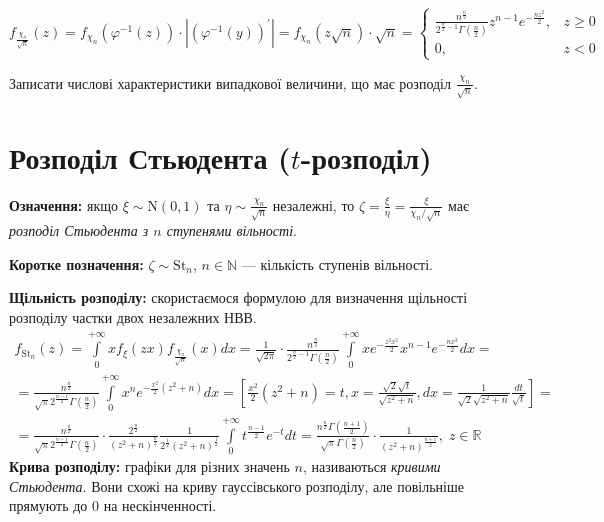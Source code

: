 \begin{equation*}
    f_{\frac{\chi_n}{\sqrt{n}}}(z) = f_{\chi_n}\left(\varphi^{-1} (z)\right) \cdot \left|\left(\varphi^{-1} (y) \right)^{\prime}\right| =
f_{\chi_n}(z \sqrt{n}) \cdot \sqrt{n} = 
\begin{cases}
    \frac{n^{\frac{n}{2}}}{2^{\frac{n}{2} - 1} \Gamma\left(\frac{n}{2}\right)} z^{n-1} e^{-\frac{nz^2}{2}}, & z \geq 0 \\
    0, & z < 0
\end{cases}
\end{equation*}
\begin{exercise}
    Записати числові характеристики випадкової величини, що має розподіл $\frac{\chi_n}{\sqrt{n}}$.
\end{exercise}

\section{Розподіл Стьюдента (\texorpdfstring{$t$}{t}-розподіл)}
\noindent\textbf{Означення:} якщо $\xi \sim \mathrm{N}(0, 1)$ та $\eta \sim \frac{\chi_n}{\sqrt{n}}$ незалежні,
то $\zeta = \frac{\xi}{\eta} = \frac{\xi}{\chi_n /\sqrt{n}}$ має \emph{розподіл Стьюдента з $n$ ступенями вільності}.

\noindent\textbf{Коротке позначення:} $\zeta \sim \mathrm{St}_n$, $n\in\mathbb{N}$ --- кількість ступенів вільності.

\noindent\textbf{Щільність розподілу:} скористаємося формулою для визначення щільності розподілу частки
двох незалежних НВВ.
\begin{gather*}
    f_{\mathrm{St}_n} (z) = \int\limits_0^{+\infty} x f_{\xi}(z x) f_{\frac{\chi_n}{\sqrt{n}}} (x) dx =
    \frac{1}{\sqrt{2\pi}} \cdot \frac{n^{\frac{n}{2}}}{2^{\frac{n}{2} - 1} \Gamma\left(\frac{n}{2}\right)}
    \int\limits_0^{+\infty} x e^{-\frac{z^2 x^2}{2}} x^{n-1} e^{-\frac{nx^2}{2}} dx = \\
    = \frac{n^{\frac{n}{2}}}{\sqrt{\pi} 2^{\frac{n-1}{2}} \Gamma\left(\frac{n}{2}\right)}
    \int\limits_0^{+\infty} x^n e^{-\frac{x^2}{2}(z^2+n)} dx = 
    \left[ \frac{x^2}{2} (z^2 + n) = t, x = \frac{\sqrt{2} \sqrt{t}}{\sqrt{z^2 + n}},
    dx = \frac{1}{\sqrt{2}\sqrt{z^2 + n}} \frac{dt}{\sqrt{t}}\right] = \\
    = \frac{n^{\frac{n}{2}}}{\sqrt{\pi} 2^{\frac{n-1}{2}} \Gamma\left(\frac{n}{2}\right)} \cdot
    \frac{2^{\frac{n}{2}}}{(z^2 + n)^{\frac{n}{2}}} \frac{1}{2^{\frac{1}{2}}(z^2 + n)^{\frac{1}{2}}}
    \int\limits_0^{+\infty} t^{\frac{n-1}{2}} e^{-t} dt = 
    \frac{n^{\frac{n}{2}} \Gamma\left(\frac{n+1}{2}\right)}{\sqrt{\pi} \Gamma\left(\frac{n}{2}\right)} \cdot
    \frac{1}{(z^2 + n)^{\frac{n+1}{2}}}, \; z \in \mathbb{R}
\end{gather*}
\noindent \textbf{Крива розподілу:} графіки для різних значень $n$, називаються \emph{кривими Стьюдента}.
Вони схожі на криву гауссівського розподілу, але повільніше прямують до 0 на нескінченності.


